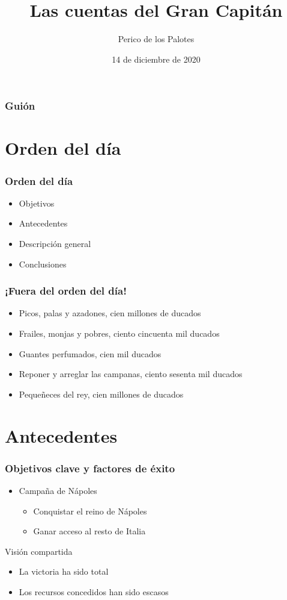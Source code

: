 \documentclass{beamer}
\title{Las cuentas del Gran Capitán}
\author{Perico de los Palotes}
\institute{Reino de Castilla y León}
\date{14 de diciembre de 2020}
\begin{document}
\begin{frame}
\titlepage
\end{frame}

\begin{frame}
\frametitle{Guión}
\tableofcontents
\end{frame}

\section{Orden del día}
\begin{frame}
\frametitle{Orden del día}

\begin{itemize}
\item Objetivos
\item Antecedentes
\item Descripción general
\item Conclusiones
\end{itemize}

\end{frame}

\begin{frame}
\frametitle{¡Fuera del orden del día!}

\begin{itemize}
\item Picos, palas y azadones, cien millones de ducados
\pause
\item Frailes, monjas y pobres, ciento cincuenta mil ducados
\pause
\item Guantes perfumados, cien mil ducados
\pause
\item Reponer y arreglar las campanas, ciento sesenta mil ducados
\pause
\item Pequeñeces del rey, cien millones de ducados 
\end{itemize}

\end{frame}


\section{Antecedentes}

\begin{frame}
\frametitle{Objetivos clave y  factores de éxito}

\begin{itemize}
\item Campaña de Nápoles
\begin{itemize}
\item Conquistar el reino de Nápoles
\item Ganar acceso al resto de Italia
\end{itemize}
\end{itemize}


\begin{block}{Visión compartida}
\begin{itemize}
\item La victoria ha sido total
\item Los  recursos concedidos han sido escasos
\end{itemize}
\end{block}

\end{frame}
\end{document}
